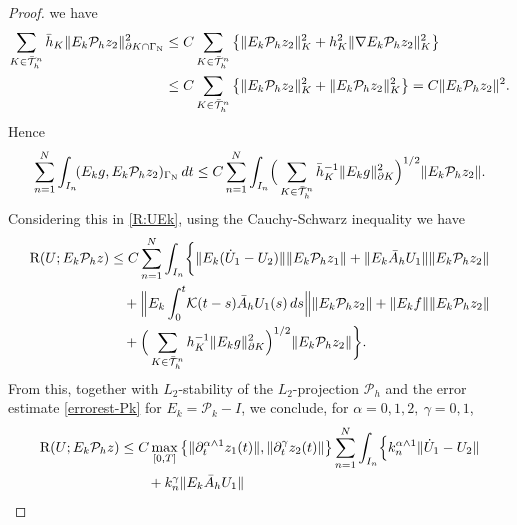 \documentclass{amsart}
\numberwithin{equation}{section}
\theoremstyle{definition}
\begin{document}
\begin{proof}
we have
\begin{equation*}
  \begin{split}
    \sum_{K\in\bar{\mathcal T}_h^n}
       \bar h_K\|E_k{\mathcal P}_hz_2\|_{\partial K \cap \Gamma_{\text N}}^2
    &\le C\sum_{K\in\bar{\mathcal T}_h^n}
      \big\{\|E_k{\mathcal P}_hz_2\|_K^2
      + h_K^2\|\nabla E_k{\mathcal P}_hz_2\|_K^2\big\}\\
    &\le C \sum_{K\in\bar{\mathcal T}_h^n}
      \big\{\|E_k{\mathcal P}_hz_2\|_K^2
      +\|E_k{\mathcal P}_hz_2\|_K^2\big\}
    = C \|E_k{\mathcal P}_hz_2\|^2.
  \end{split}
\end{equation*}
Hence
\begin{equation*}
  \begin{split}
   \sum_{n=1}^N\int_{I_n}\!
    (E_kg,E_k{\mathcal P}_hz_2)_{\Gamma_{\text N}}\,dt
    \le C \sum_{n=1}^N\int_{I_n}\!
    \Big(\sum_{K\in\bar {\mathcal T}_h^n}
     \bar h_K^{-1}\|E_kg\|_{\partial K}^2\Big)^{1/2}
     \|E_k{\mathcal P}_hz_2\|.
  \end{split}
\end{equation*}
Considering this in \eqref{R:UEk}, using the Cauchy-Schwarz inequality  
we have
\begin{equation*}  
  \begin{split}
   {\text R}(U;E_k{\mathcal P}_h z)
    &\le C\sum_{n=1}^N\int_{I_n}\!
      \bigg\{\|E_k(\dot U_1-U_2)\|\|E_k{\mathcal P}_hz_1\|
      +\|E_k\bar A_hU_1\|\|E_k{\mathcal P}_hz_2\|\\
    &\quad 
     +\Big\|E_k\int_0^t\! {\mathcal K}(t-s)\bar A_hU_1(s)\,ds\Big\|\|E_k{\mathcal P}_hz_2\|
      +\|E_kf\|\|E_k{\mathcal P}_hz_2\|\\
     &\quad +\Big(\sum_{K\in\bar{\mathcal T}_h^n}
     h_K^{-1}\|E_kg\|_{\partial K}^2\Big)^{1/2}
     \|E_k{\mathcal P}_hz_2\|
      \bigg\}.
  \end{split}
\end{equation*}
From this, 
together with $L_2$-stability of the $L_2$-projection 
${\mathcal P}_h$ and the error estimate \eqref{errorest-Pk} for 
$E_k={\mathcal P}_k-I$, we conclude, for $\alpha=0,1,2,\ \gamma=0,1$,
\begin{equation}   \label{R:UEk:estimate}
  \begin{split}
   {\text R}(U;E_k{\mathcal P}_h z)
    &\le C \max_{[0,T]}
    \big\{\| \partial^{\alpha \wedge 1}_t z_1(t)\| 
      ,\| \partial^\gamma_t z_2(t)\|
    \big\}
    
      \sum_{n=1}^N\int_{I_n}\!
     \Big\{k_n^{\alpha \wedge 1} \|\dot U_1-U_2\| \\
    &\qquad  +k_n^\gamma\|E_k\bar A_hU_1\|
   

\end{split}
\end{equation}
\end{proof}
\end{document}
